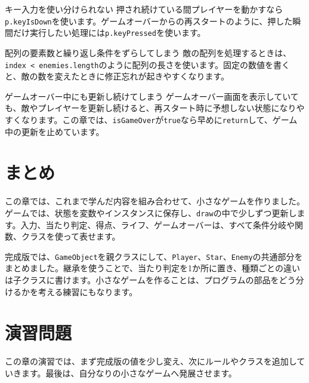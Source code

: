 \begin{mistakebox}{キー入力を使い分けられない}
押され続けている間プレイヤーを動かすなら\texttt{p.keyIsDown}を使います。ゲームオーバーからの再スタートのように、押した瞬間だけ実行したい処理には\texttt{p.keyPressed}を使います。
\end{mistakebox}

\begin{mistakebox}{配列の要素数と繰り返し条件をずらしてしまう}
敵の配列を処理するときは、\texttt{index < enemies.length}のように配列の長さを使います。固定の数値を書くと、敵の数を変えたときに修正忘れが起きやすくなります。
\end{mistakebox}

\begin{mistakebox}{ゲームオーバー中にも更新し続けてしまう}
ゲームオーバー画面を表示していても、敵やプレイヤーを更新し続けると、再スタート時に予想しない状態になりやすくなります。この章では、\texttt{isGameOver}が\texttt{true}なら早めに\texttt{return}して、ゲーム中の更新を止めています。
\end{mistakebox}

\section{まとめ}

この章では、これまで学んだ内容を組み合わせて、小さなゲームを作りました。ゲームでは、状態を変数やインスタンスに保存し、\texttt{draw}の中で少しずつ更新します。入力、当たり判定、得点、ライフ、ゲームオーバーは、すべて条件分岐や関数、クラスを使って表せます。

完成版では、\texttt{GameObject}を親クラスにして、\texttt{Player}、\texttt{Star}、\texttt{Enemy}の共通部分をまとめました。継承を使うことで、当たり判定を1か所に置き、種類ごとの違いは子クラスに書けます。小さなゲームを作ることは、プログラムの部品をどう分けるかを考える練習にもなります。

\section{演習問題}

この章の演習では、まず完成版の値を少し変え、次にルールやクラスを追加していきます。最後は、自分なりの小さなゲームへ発展させます。

